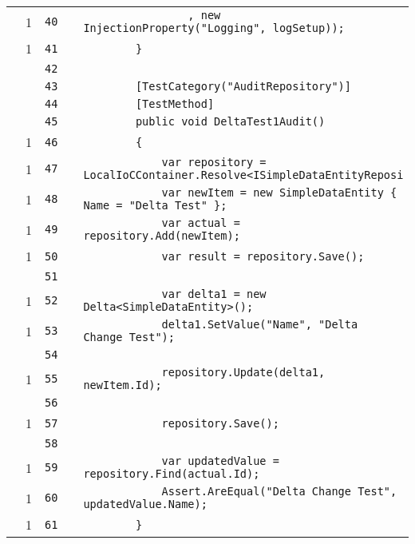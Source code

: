 \documentclass[a4paper,10pt]{article}
\begin{document}
\begin{longtable}[l]{lrrll}
\cellcolor{green} & 1 & \verb~40~ & & \verb~                , new InjectionProperty("Logging", logSetup));~\\
\cellcolor{green} & 1 & \verb~41~ & & \verb~        }~\\
\cellcolor{gray} &  & \verb~42~ & & \verb~~\\
\cellcolor{gray} &  & \verb~43~ & & \verb~        [TestCategory("AuditRepository")]~\\
\cellcolor{gray} &  & \verb~44~ & & \verb~        [TestMethod]~\\
\cellcolor{gray} &  & \verb~45~ & & \verb~        public void DeltaTest1Audit()~\\
\cellcolor{green} & 1 & \verb~46~ & & \verb~        {~\\
\cellcolor{green} & 1 & \verb~47~ & & \verb~            var repository = LocalIoCContainer.Resolve<ISimpleDataEntityReposi~\\
\cellcolor{green} & 1 & \verb~48~ & & \verb~            var newItem = new SimpleDataEntity { Name = "Delta Test" };~\\
\cellcolor{green} & 1 & \verb~49~ & & \verb~            var actual = repository.Add(newItem);~\\
\cellcolor{green} & 1 & \verb~50~ & & \verb~            var result = repository.Save();~\\
\cellcolor{gray} &  & \verb~51~ & & \verb~~\\
\cellcolor{green} & 1 & \verb~52~ & & \verb~            var delta1 = new Delta<SimpleDataEntity>();~\\
\cellcolor{green} & 1 & \verb~53~ & & \verb~            delta1.SetValue("Name", "Delta Change Test");~\\
\cellcolor{gray} &  & \verb~54~ & & \verb~~\\
\cellcolor{green} & 1 & \verb~55~ & & \verb~            repository.Update(delta1, newItem.Id);~\\
\cellcolor{gray} &  & \verb~56~ & & \verb~~\\
\cellcolor{green} & 1 & \verb~57~ & & \verb~            repository.Save();~\\
\cellcolor{gray} &  & \verb~58~ & & \verb~~\\
\cellcolor{green} & 1 & \verb~59~ & & \verb~            var updatedValue = repository.Find(actual.Id);~\\
\cellcolor{green} & 1 & \verb~60~ & & \verb~            Assert.AreEqual("Delta Change Test", updatedValue.Name);~\\
\cellcolor{green} & 1 & \verb~61~ & & \verb~        }~\\

\end{longtable}
\end{document}
